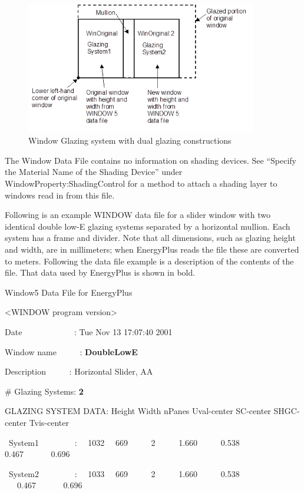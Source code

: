 \begin{figure}[hbtp] %
\centering
\includegraphics[width=0.9\textwidth, height=0.9\textheight, keepaspectratio=true]{media/image002.png}
\caption{Window Glazing system with dual glazing constructions \protect \label{fig:window-glazing-system-with-dual-glazing}}
\end{figure}

The Window Data File contains no information on shading devices. See ``Specify the Material Name of the Shading Device'' under WindowProperty:ShadingControl for a method to attach a shading layer to windows read in from this file.

Following is an example WINDOW data file for a slider window with two identical double low-E glazing systems separated by a horizontal mullion. Each system has a frame and divider. Note that all dimensions, such as glazing height and width, are in millimeters; when EnergyPlus reads the file these are converted to meters. Following the data file example is a description of the contents of the file. That data used by EnergyPlus is shown in bold.

Window5 Data File for EnergyPlus

\textless{}WINDOW program version\textgreater{}

Date~~~~~~~~~~~~ : Tue Nov 13 17:07:40 2001

Window name~~~~~ : \textbf{DoubleLowE}

Description~~~~~ : Horizontal Slider, AA

\# Glazing Systems: \textbf{2}

GLAZING SYSTEM DATA: Height Width nPanes Uval-center SC-center SHGC-center Tvis-center

~System1~~~~~~~~ :~~ 1032~~ 669~~~~~ 2~~~~~ 1.660~~~~~ 0.538~~~~~ 0.467~~~~~~ 0.696

~System2~~~~~~~~ :~~ 1033~~ 669~~~~~ 2~~~~~ 1.660~~~~~ 0.538~~ ~~~0.467~~~~~~ 0.696

